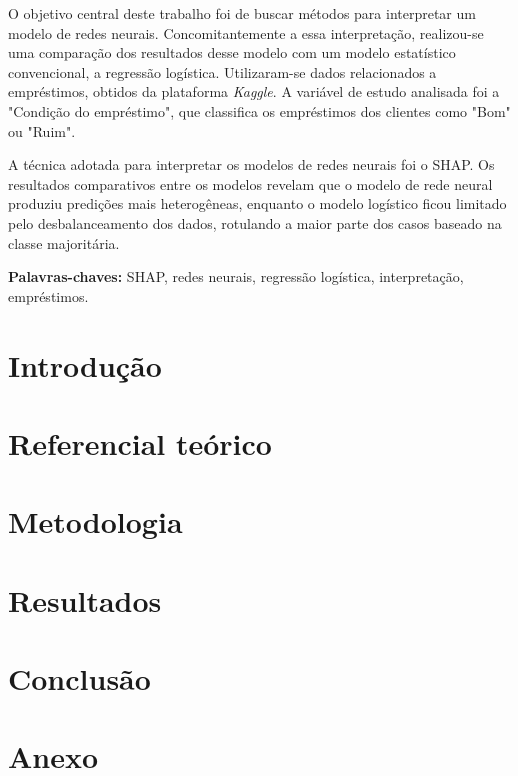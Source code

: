 \documentclass[12pt, a4paper, twoside]{article}
\numberwithin{equation}{subsection} %
\begin{document}
\vspace{1cm}

O objetivo central deste trabalho foi de buscar métodos para interpretar um modelo de redes neurais. 
Concomitantemente a essa interpretação, realizou-se uma comparação dos resultados desse modelo
 com um modelo estatístico convencional, a regressão logística. Utilizaram-se dados relacionados a empréstimos, 
 obtidos da plataforma \textit{Kaggle}. A variável de estudo analisada foi a "Condição do empréstimo", que 
 classifica os empréstimos dos clientes como "Bom" ou "Ruim".

A técnica adotada para interpretar os modelos de redes neurais foi o SHAP.
Os resultados comparativos entre os modelos revelam que o modelo de rede neural produziu predições mais heterogêneas,
enquanto o modelo logístico ficou limitado pelo desbalanceamento dos dados, rotulando a maior parte dos casos baseado
na classe majoritária.



\begin{flushleft}
    \textbf{Palavras-chaves:} SHAP, redes neurais, regressão logística, interpretação, empréstimos.
\end{flushleft}
    

\newpage


\listoftables
\newpage


\listoffigures
\newpage


\tableofcontents
\newpage

\section{\textbf{Introdução}}

\newpage


\section{\textbf{Referencial teórico}}

\newpage

\section{\textbf{Metodologia}}

\newpage


\section{\textbf{Resultados}}

\newpage



% 

\section{\textbf{Conclusão}}

\newpage




\newpage
\section{\textbf{Anexo}}
\newpage
\end{document}
